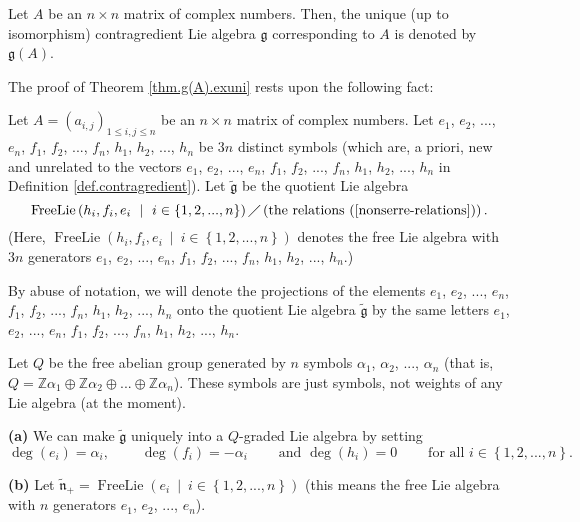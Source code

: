 \documentclass[etingof-lie.tex]{subfiles}
\begin{document}
\begin{definition}
Let $A$ be an $n\times n$ matrix of complex numbers. Then, the unique (up to
isomorphism) contragredient Lie algebra $\mathfrak{g}$ corresponding to $A$ is
denoted by $\mathfrak{g}\left(  A\right)  $.
\end{definition}

The proof of Theorem \ref{thm.g(A).exuni} rests upon the following fact:

\begin{theorem}
\label{thm.gtilde}Let $A=\left(  a_{i,j}\right)  _{1\leq i,j\leq n}$ be an
$n\times n$ matrix of complex numbers. Let $e_{1}$, $e_{2}$, $...$, $e_{n}$,
$f_{1}$, $f_{2}$, $...$, $f_{n}$, $h_{1}$, $h_{2}$, $...$, $h_{n}$ be $3n$
distinct symbols (which are, a priori, new and unrelated to the vectors
$e_{1}$, $e_{2}$, $...$, $e_{n}$, $f_{1}$, $f_{2}$, $...$, $f_{n}$, $h_{1}$,
$h_{2}$, $...$, $h_{n}$ in Definition \ref{def.contragredient}). Let
$\widetilde{\mathfrak{g}}$ be the quotient Lie algebra
\[
\operatorname*{FreeLie}\left(  h_{i},f_{i},e_{i}\ \mid\ i\in\left\{
1,2,...,n\right\}  \right)  \diagup\left(  \text{the relations
(\ref{nonserre-relations})}\right)  .
\]
(Here, $\operatorname*{FreeLie}\left(  h_{i},f_{i},e_{i}\ \mid\ i\in\left\{
1,2,...,n\right\}  \right)  $ denotes the free Lie algebra with $3n$
generators $e_{1}$, $e_{2}$, $...$, $e_{n}$, $f_{1}$, $f_{2}$, $...$, $f_{n}$,
$h_{1}$, $h_{2}$, $...$, $h_{n}$.)

By abuse of notation, we will denote the projections of the elements $e_{1}$,
$e_{2}$, $...$, $e_{n}$, $f_{1}$, $f_{2}$, $...$, $f_{n}$, $h_{1}$, $h_{2}$,
$...$, $h_{n}$ onto the quotient Lie algebra $\widetilde{\mathfrak{g}}$ by the
same letters $e_{1}$, $e_{2}$, $...$, $e_{n}$, $f_{1}$, $f_{2}$, $...$,
$f_{n}$, $h_{1}$, $h_{2}$, $...$, $h_{n}$.

Let $Q$ be the free abelian group generated by $n$ symbols $\alpha_{1}$,
$\alpha_{2}$, $...$, $\alpha_{n}$ (that is, $Q=\mathbb{Z}\alpha_{1}%
\oplus\mathbb{Z}\alpha_{2}\oplus...\oplus\mathbb{Z}\alpha_{n}$). These symbols
are just symbols, not weights of any Lie algebra (at the moment).

\textbf{(a)} We can make $\widetilde{\mathfrak{g}}$ uniquely into a $Q$-graded
Lie algebra by setting%
\[
\deg\left(  e_{i}\right)  =\alpha_{i},\ \ \ \ \ \ \ \ \ \ \deg\left(
f_{i}\right)  =-\alpha_{i}\ \ \ \ \ \ \ \ \ \ \text{and }\deg\left(
h_{i}\right)  =0\ \ \ \ \ \ \ \ \ \ \text{for all }i\in\left\{
1,2,...,n\right\}  .
\]


\textbf{(b)} Let $\widetilde{\mathfrak{n}}_{+}=\operatorname*{FreeLie}\left(
e_{i}\ \mid\ i\in\left\{  1,2,...,n\right\}  \right)  $ (this means the free
Lie algebra with $n$ generators $e_{1}$, $e_{2}$, $...$, $e_{n}$).


\end{theorem}
\end{document}
